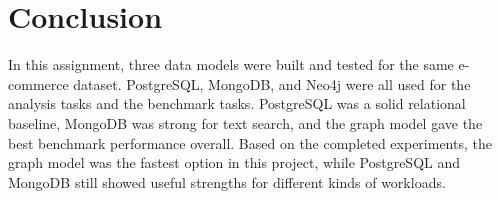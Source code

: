 \documentclass[11pt,a4paper]{article}
\begin{document}
\section{Conclusion}
In this assignment, three data models were built and tested for the same e-commerce dataset. PostgreSQL, MongoDB, and Neo4j were all used for the analysis tasks and the benchmark tasks. PostgreSQL was a solid relational baseline, MongoDB was strong for text search, and the graph model gave the best benchmark performance overall. Based on the completed experiments, the graph model was the fastest option in this project, while PostgreSQL and MongoDB still showed useful strengths for different kinds of workloads.
\end{document}
